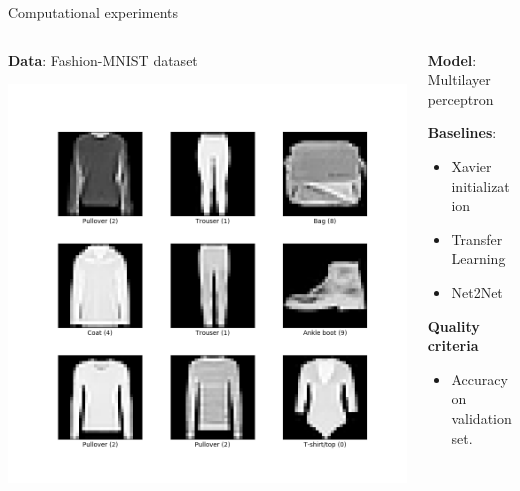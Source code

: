 \documentclass[dvipsnames,aspectratio=169]{beamer}
\begin{document}

\begin{frame}{Computational experiments}

\begin{columns}
\begin{column}{0.5\textwidth}
    \textbf{Data}: Fashion-MNIST dataset 
    \begin{center}
        \includegraphics[width=\textwidth]{figures/fashion_mnist.png}
    \end{center}

\end{column}

\begin{column}{0.5\textwidth}
    \textbf{Model}: Multilayer perceptron

    \textbf{Baselines}: 
    \begin{itemize}
        \item Xavier initialization
        \item Transfer Learning
        \item Net2Net
    \end{itemize}

    \textbf{Quality criteria}
    \begin{itemize}
        \item Accuracy on validation set.
    

\end{itemize}
\end{column}
\end{columns}
\end{frame}
\end{document}
